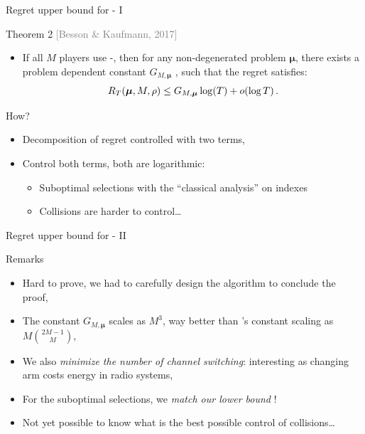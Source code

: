 \documentclass[12pt,english,ignorenonframetext,]{beamer}
\providecommand{\tightlist}{%
  \setlength{\itemsep}{0pt}\setlength{\parskip}{0pt}}
\begin{document}
\begin{frame}{Regret upper bound for \MCTopM-\klUCB{} I}

\begin{block}{Theorem 2
\hfill{}\textcolor{gray}{[Besson \& Kaufmann, 2017]}}

\begin{itemize}
\tightlist
\item
  If all \(M\) players use \MCTopM-\klUCB, then for any non-degenerated
  problem \(\boldsymbol{\mu}\), there exists a problem dependent
  constant \(G_{M,\boldsymbol{\mu}}\) , such that the regret satisfies:
  \[
  R_T(\boldsymbol{\mu}, M, \rho) \leq G_{M,\boldsymbol{\mu}} \log(T) + \mathop{}\mathopen{}o\mathopen{}\left(\log T\right).
    \]
\end{itemize}

\pause

\end{block}

\begin{block}{How?}

\begin{itemize}
\tightlist
\item
  Decomposition of regret controlled with two terms,
\item
  Control both terms, both are logarithmic:

  \begin{itemize}
  \tightlist
  \item
    Suboptimal selections with the ``classical analysis'' on \klUCB{}
    indexes
  \item
    Collisions are harder to control\ldots{}
  \end{itemize}
\end{itemize}

\end{block}

\end{frame}

\begin{frame}{Regret upper bound for \MCTopM-\klUCB{} II}

\begin{block}{Remarks}

\begin{itemize}
\tightlist
\item
  Hard to prove, we had to carefully design the \MCTopM{} algorithm to
  conclude the proof,\pause
\item
  The constant \(G_{M,\boldsymbol{\mu}}\) scales as \(M^3\), way better
  than \rhoRand's constant scaling as \(M{2M-1 \choose M}\),\pause
\item
  We also \emph{minimize the number of channel switching}: interesting
  as changing arm costs energy in radio systems,\pause
\item
  For the suboptimal selections, we \emph{match our lower bound} !\pause
\item
  Not yet possible to know what is the best possible control of
  collisions\ldots{}
\end{itemize}

\end{block}

\end{frame}
\end{document}
